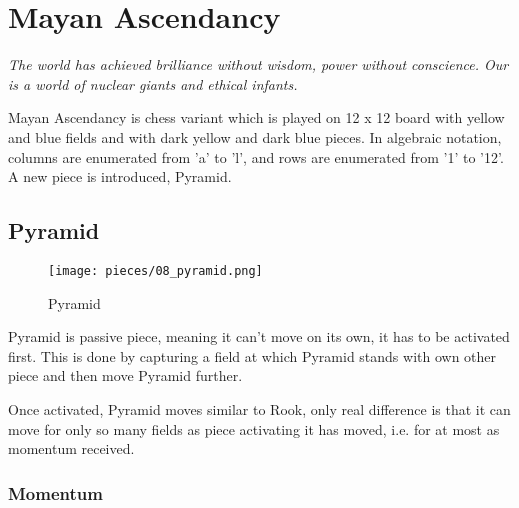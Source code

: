 

\chapter*{Mayan Ascendancy}

\begin{flushright}
\parbox{0.8\textwidth}{
\emph{The world has achieved brilliance without wisdom, power without
conscience. Our is a world of nuclear giants and ethical infants. \\
 } }
\end{flushright}

\noindent
Mayan Ascendancy is chess variant which is played on 12 x 12 board with
yellow and blue fields and with dark yellow and dark blue pieces. In
algebraic notation, columns are enumerated from 'a' to 'l', and rows are
enumerated from '1' to '12'. A new piece is introduced, Pyramid.

\clearpage %

\section*{Pyramid}

\noindent
\begin{wrapfigure}[12]{l}{0.4\textwidth}
\centering
\texttt{[image: pieces/08\_pyramid.png]}
\caption{Pyramid}
\label{fig:08_pyramid}
\end{wrapfigure}
Pyramid is passive piece, meaning it can't move on its own, it has to be
activated first. This is done by capturing a field at which Pyramid stands
with own other piece and then move Pyramid further.

Once activated, Pyramid moves similar to Rook, only real difference is that
it can move for only so many fields as piece activating it has moved, i.e.
for at most as momentum received.

\subsection*{Momentum}

